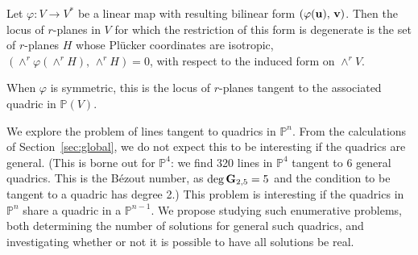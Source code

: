\begin{theorem}
Let $\varphi\colon V\to V^*$ be a linear map with resulting bilinear form
$(\varphi({\bf u}),\,{\bf v})$.
Then the locus of $r$-planes in $V$ for which the restriction of this form
is degenerate is the set of $r$-planes $H$ whose Pl\"ucker
coordinates are
isotropic, $(\wedge^r\varphi(\wedge^rH),\,\wedge^rH)=0$, with respect to the
induced form on $\wedge^rV$.

When $\varphi$ is symmetric, this is the locus of $r$-planes tangent to the
associated quadric in ${\mathbb P}(V)$.
\end{theorem}


We explore the problem of lines tangent to quadrics in ${\mathbb P}^n$.
From the calculations of Section~\ref{sec:global}, we do not expect this to
be interesting if the quadrics are general.
(This is borne out for ${\mathbb P}^4$:
 we find 320 lines in ${\mathbb P}^4$ tangent to 6 general quadrics.
 This is the B\'ezout number, as $\deg{\bf G}_{2,5}=5$
 and the condition to be tangent to a quadric has degree 2.)
This problem is interesting if the quadrics 
in ${\mathbb P}^n$ share a quadric in a ${\mathbb P}^{n-1}$.
We propose studying such enumerative problems, both determining the 
number of solutions for general such quadrics, and investigating whether or
not it is possible to have all solutions be real. 

